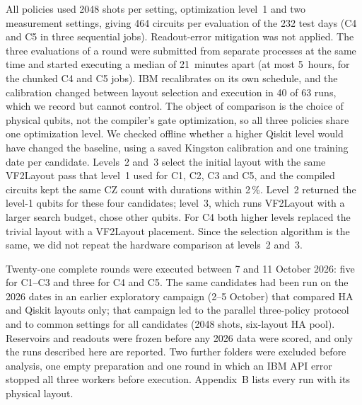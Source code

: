 \documentclass[journal]{IEEEtran}
\begin{document}
All policies used 2048 shots per setting, optimization level~1 and two measurement settings, giving 464 circuits per evaluation of the 232 test days (C4 and C5 in three sequential jobs). Readout-error mitigation was not applied. The three evaluations of a round were submitted from separate processes at the same time and started executing a median of 21~minutes apart (at most 5~hours, for the chunked C4 and C5 jobs). IBM recalibrates on its own schedule, and the calibration changed between layout selection and execution in 40 of 63 runs, which we record but cannot control. The object of comparison is the choice of physical qubits, not the compiler's gate optimization, so all three policies share one optimization level. We checked offline whether a higher Qiskit level would have changed the baseline, using a saved Kingston calibration and one training date per candidate. Levels~2 and~3 select the initial layout with the same VF2Layout pass that level~1 used for C1, C2, C3 and C5, and the compiled circuits kept the same CZ count with durations within 2\,\%. Level~2 returned the level-1 qubits for these four candidates; level~3, which runs VF2Layout with a larger search budget, chose other qubits. For C4 both higher levels replaced the trivial layout with a VF2Layout placement. Since the selection algorithm is the same, we did not repeat the hardware comparison at levels~2 and~3.

Twenty-one complete rounds were executed between 7 and 11 October 2026: five for C1--C3 and three for C4 and C5. The same candidates had been run on the 2026 dates in an earlier exploratory campaign (2--5 October) that compared HA and Qiskit layouts only; that campaign led to the parallel three-policy protocol and to common settings for all candidates (2048 shots, six-layout HA pool). Reservoirs and readouts were frozen before any 2026 data were scored, and only the runs described here are reported. Two further folders were excluded before analysis, one empty preparation and one round in which an IBM API error stopped all three workers before execution. Appendix~B lists every run with its physical layout.
\end{document}
